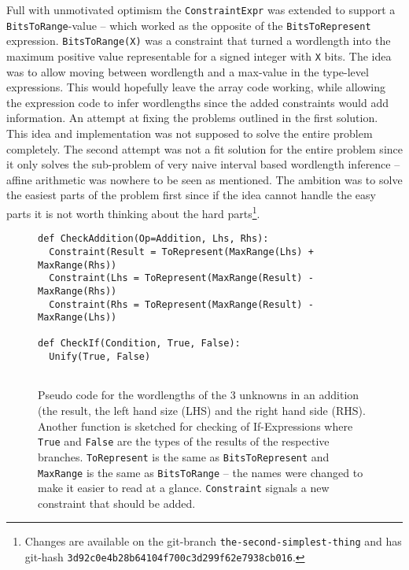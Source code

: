 Full with unmotivated optimism the \verb+ConstraintExpr+ was extended to support a \verb+BitsToRange+-value -- which worked as the opposite of the \verb+BitsToRepresent+ expression. \verb+BitsToRange(X)+ was a constraint that turned a wordlength into the maximum positive value representable for a signed integer with \verb+X+ bits. The idea was to allow moving between wordlength and a max-value in the type-level expressions. This would hopefully leave the array code working, while allowing the expression code to infer wordlengths since the added constraints would add information. An attempt at fixing the problems outlined in the first solution. This idea and implementation was not supposed to solve the entire problem completely. The second attempt was not a fit solution for the entire problem since it only solves the sub-problem of very naive interval based wordlength inference -- affine arithmetic was nowhere to be seen as mentioned. The ambition was to solve the easiest parts of the problem first since if the idea cannot handle the easy parts it is not worth thinking about the hard parts\cprotect\footnote{Changes are available on the git-branch \verb+the-second-simplest-thing+ and has git-hash \verb+3d92c0e4b28b64104f700c3d299f62e7938cb016+.}.

\begin{figure}[h!]
\begin{verbatim}
def CheckAddition(Op=Addition, Lhs, Rhs):
  Constraint(Result = ToRepresent(MaxRange(Lhs) + MaxRange(Rhs))
  Constraint(Lhs = ToRepresent(MaxRange(Result) - MaxRange(Rhs))
  Constraint(Rhs = ToRepresent(MaxRange(Result) - MaxRange(Lhs))

def CheckIf(Condition, True, False):
  Unify(True, False)
  
\end{verbatim}
  \cprotect\caption{Pseudo code for the wordlengths of the 3 unknowns in an addition (the result, the left hand size (LHS) and the right hand side (RHS). Another function is sketched for checking of If-Expressions where \verb+True+ and \verb+False+ are the types of the results of the respective branches. \verb+ToRepresent+ is the same as \verb+BitsToRepresent+ and \verb+MaxRange+ is the same as \verb+BitsToRange+ -- the names were changed to make it easier to read at a glance. \verb+Constraint+ signals a new constraint that should be added.}
\label{fig:SecondAlgo}
\end{figure}

